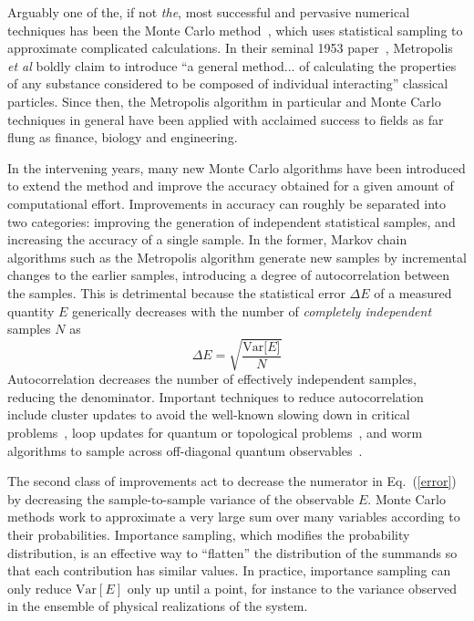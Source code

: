 \documentclass[aps,prl,nopacs,twocolumn]{revtex4}
\newcommand {\Eqn}[1] {Eq.~(\ref{#1})}
\begin{document}
Arguably one of the, if not \emph{the}, most successful and pervasive numerical techniques has been the Monte Carlo method~\cite{Metropolis1949}, which uses statistical sampling to approximate complicated calculations. In their seminal 1953 paper~\cite{Metropolis1953}, Metropolis \emph{et al} boldly claim to introduce ``a general method... of calculating the properties of any substance considered to be composed of individual interacting'' classical particles. Since then, the Metropolis algorithm in particular and Monte Carlo techniques in general have been applied with acclaimed success to fields as far flung as finance, biology and engineering. 

In the intervening years, many new Monte Carlo algorithms have been introduced to extend the method and improve the accuracy obtained for a given amount of computational effort. Improvements in accuracy can roughly be separated into two categories: improving the generation of independent statistical samples, and increasing the accuracy of a single sample. In the former, Markov chain algorithms such as the Metropolis algorithm generate new samples by incremental changes to the earlier samples, introducing a degree of autocorrelation between the samples. This is detrimental because the statistical error $\Delta E$ of a measured quantity $E$ generically decreases with the number of \emph{completely independent} samples $N$ as
\begin{equation}
    \Delta E = \sqrt{\frac{\mathrm{Var}\bigl[E\bigr]}{N}} \label{error}
\end{equation}
Autocorrelation decreases the number of effectively independent samples, reducing the denominator. Important techniques to reduce autocorrelation include cluster updates to avoid the well-known slowing down in critical problems~\cite{Swendsen1987,Wolff1989}, loop updates for quantum or topological problems~\cite{Evertz1993,Evertz2003}, and worm algorithms to sample across off-diagonal quantum observables~\cite{Prokofev1998}.

The second class of improvements act to decrease the numerator in \Eqn{error} by decreasing the sample-to-sample variance of the observable $E$. Monte Carlo methods work to approximate a very large sum over many variables according to their probabilities. Importance sampling, which modifies the probability distribution, is an effective way to ``flatten'' the distribution of the summands so that each contribution has similar values. In practice, importance sampling can only reduce $\mathrm{Var}[E]$ only up until a point, for instance to the variance observed in the ensemble of physical realizations of the system. 
\end{document}
